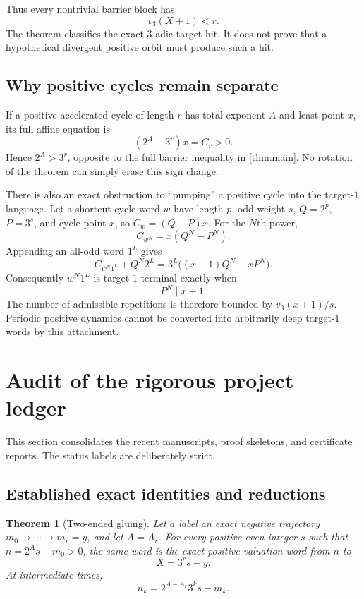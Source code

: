 \documentclass[11pt]{article}
\newtheorem{theorem}{Theorem}[section]
\theoremstyle{definition}
\theoremstyle{remark}
\begin{document}
Thus every nontrivial barrier block has
\[
 v_3(X+1)<r.                                           \tag{9.1}
\]
The theorem classifies the exact $3$-adic target hit.  It does not prove that
a hypothetical divergent positive orbit must produce such a hit.

\subsection{Why positive cycles remain separate}

If a positive accelerated cycle of length $r$ has total exponent $A$ and
least point $x$, its full affine equation is
\[
 (2^A-3^r)x=C_r>0.                                    \tag{9.2}
\]
Hence $2^A>3^r$, opposite to the full barrier inequality in
\cref{thm:main}.  No rotation of the theorem can simply erase this sign
change.

There is also an exact obstruction to ``pumping'' a positive cycle into the
target-$1$ language.  Let a shortcut-cycle word $w$ have length $p$, odd
weight $s$, $Q=2^p$, $P=3^s$, and cycle point $x$, so
$C_w=(Q-P)x$.  For the $N$th power,
\[
 C_{w^N}=x(Q^N-P^N).
\]
Appending an all-odd word $1^L$ gives
\[
 C_{w^N1^L}+Q^N2^L
 =3^L\bigl((x+1)Q^N-xP^N\bigr).                      \tag{9.3}
\]
Consequently $w^N1^L$ is target-$1$ terminal exactly when
\[
 P^N\mid x+1.                                         \tag{9.4}
\]
The number of admissible repetitions is therefore bounded by
$v_3(x+1)/s$.  Periodic positive dynamics cannot be converted into
arbitrarily deep target-$1$ words by this attachment.

\section{Audit of the rigorous project ledger}\label{sec:ledger}

This section consolidates the recent manuscripts, proof skeletons, and
certificate reports.  The status labels are deliberately strict.

\subsection{Established exact identities and reductions}

\begin{theorem}[Two-ended gluing]\label{thm:gluing}
Let $a$ label an exact negative trajectory
$m_0\to\cdots\to m_r=y$, and let $A=A_r$.  For every positive even integer
$s$ such that $n=2^As-m_0>0$, the same word is the exact positive valuation
word from $n$ to
\[
 X=3^rs-y.                                             \tag{10.1}
\]
At intermediate times,
\[
 n_k=2^{A-A_k}3^ks-m_k.                                \tag{10.2}
\]
\end{theorem}
\end{document}
